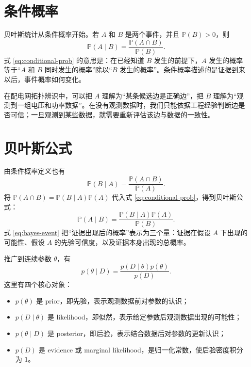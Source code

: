 \documentclass[UTF8,12pt,openany]{ctexrep}
\numberwithin{equation}{chapter}
\theoremstyle{definition}
\theoremstyle{plain}
\newcommand{\Prob}{\mathbb{P}}
\begin{document}
\section{条件概率}

贝叶斯统计从条件概率开始。若 $A$ 和 $B$ 是两个事件，并且 $\Prob(B)>0$，则
\begin{equation}
\Prob(A\mid B)=\frac{\Prob(A\cap B)}{\Prob(B)}.
\label{eq:conditional-prob}
\end{equation}
式 \eqref{eq:conditional-prob} 的意思是：在已经知道 $B$ 发生的前提下，$A$ 发生的概率等于“$A$ 和 $B$ 同时发生的概率”除以“$B$ 发生的概率”。条件概率描述的是证据到来以后，事件概率如何变化。

在配电网拓扑辨识中，可以把 $A$ 理解为“某条候选边是正确边”，把 $B$ 理解为“观测到一组电压和功率数据”。在没有观测数据时，我们只能依据工程经验判断边是否可信；一旦观测到某些数据，就需要重新评估该边与数据的一致性。

\section{贝叶斯公式}

由条件概率定义也有
\begin{equation}
\Prob(B\mid A)=\frac{\Prob(A\cap B)}{\Prob(A)}.
\end{equation}
将 $\Prob(A\cap B)=\Prob(B\mid A)\Prob(A)$ 代入式 \eqref{eq:conditional-prob}，得到贝叶斯公式：
\begin{equation}
\Prob(A\mid B)
=\frac{\Prob(B\mid A)\Prob(A)}{\Prob(B)}.
\label{eq:bayes-event}
\end{equation}
式 \eqref{eq:bayes-event} 把“证据出现后的概率”表示为三个量：证据在假设 $A$ 下出现的可能性、假设 $A$ 的先验可信度，以及证据本身出现的总概率。

推广到连续参数 $\theta$，有
\begin{equation}
p(\theta\mid D)
=\frac{p(D\mid \theta)p(\theta)}{p(D)}.
\label{eq:bayes-param}
\end{equation}
这里有四个核心对象：
\begin{itemize}[leftmargin=2em]
  \item $p(\theta)$ 是 prior，即先验，表示观测数据前对参数的认识；
  \item $p(D\mid\theta)$ 是 likelihood，即似然，表示给定参数后观测数据出现的可能性；
  \item $p(\theta\mid D)$ 是 posterior，即后验，表示结合数据后对参数的更新认识；
  \item $p(D)$ 是 evidence 或 marginal likelihood，是归一化常数，使后验密度积分为 $1$。
\end{itemize}
\end{document}
